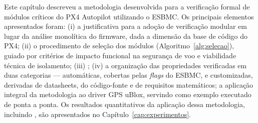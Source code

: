 Este capítulo descreveu a metodologia desenvolvida para a verificação formal de módulos críticos do PX4 Autopilot utilizando o ESBMC.  Os principais elementos apresentados foram: (i) a justificativa para a adoção de verificação modular em lugar da análise monolítica do firmware, dada a dimensão da base de código do PX4; (ii) o procedimento de seleção dos módulos (Algoritmo~\ref{alg:selecao}), guiado por critérios de impacto funcional na segurança de voo e viabilidade técnica de isolamento; (iii) ; (iv) a organização das propriedades verificadas em duas categorias --- automáticas, cobertas pelas \textit{flags} do ESBMC, e customizadas, derivadas de datasheets, do código-fonte e de requisitos matemáticos;   a aplicação integral da metodologia ao driver GPS uBlox, servindo como exemplo executado de ponta a ponta. Os resultados quantitativos da aplicação dessa metodologia, incluindo , são apresentados no Capítulo~\ref{cap:experimentos}.
